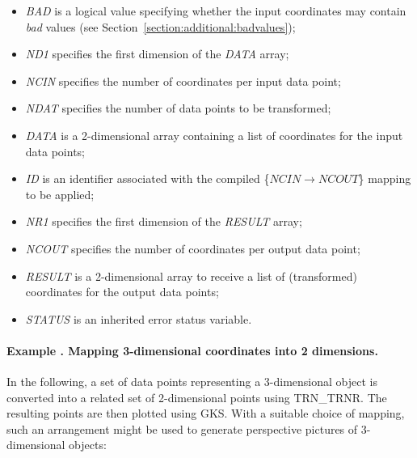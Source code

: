 \documentclass[twoside,11pt]{article}
\newcommand{\name}[1]{\mbox{\small{#1}}}
\newcommand{\fortvar}[1]{\mbox{\emph{#1}}}
\newcounter{examplecounter}
\newcommand{\example}[1]{\addtocounter{examplecounter}{1}
                         \paragraph{\textbf{Example \theexamplecounter. #1}}}
\begin{document}
\begin{itemize}

\item \fortvar{BAD} is a logical value specifying whether the input 
coordinates may contain \emph{bad} values (see 
Section~\ref{section:additional:badvalues});

\item \fortvar{ND1} specifies the first dimension of the \fortvar{DATA} 
array;

\item \fortvar{NCIN} specifies the number of coordinates per input data
point; 

\item \fortvar{NDAT} specifies the number of data points to be transformed;

\item \fortvar{DATA} is a 2-dimensional array containing a list of
coordinates for the input data points; 

\item \fortvar{ID} is an identifier associated with the compiled 
\mbox{\{$NCIN \rightarrow NCOUT$\}} mapping to be applied;

\item \fortvar{NR1} specifies the first dimension of the \fortvar{RESULT} 
array;

\item \fortvar{NCOUT} specifies the number of coordinates per output data 
point;

\item \fortvar{RESULT} is a 2-dimensional array to receive a list of 
(transformed) coordinates for the output data points; 

\item \fortvar{STATUS} is an inherited error status variable.

\end{itemize}

\example{Mapping 3-dimensional coordinates into 2 dimensions.}
In the following, a set of data points representing a 3-dimensional object
is converted into a related set of 2-dimensional points using
\name{TRN\_TRNR}. 
The resulting points are then plotted using \name{GKS}. 
With a suitable choice of mapping, such an arrangement might be used to
generate perspective pictures of 3-dimensional objects: 
\end{document}
